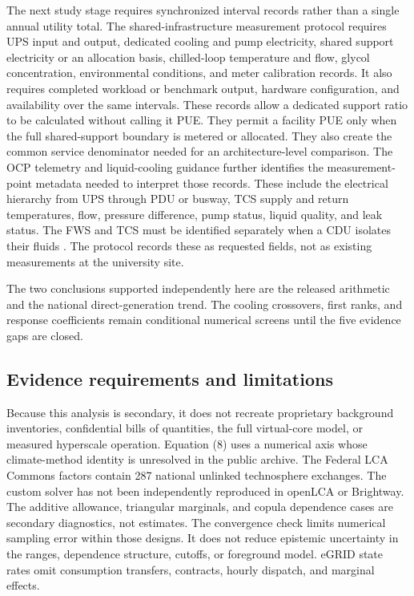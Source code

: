 \documentclass[review,12pt]{elsarticle}
\begin{document}
The next study stage requires synchronized interval records rather than a single annual utility total. The shared-infrastructure measurement protocol requires UPS input and output, dedicated cooling and pump electricity, shared support electricity or an allocation basis, chilled-loop temperature and flow, glycol concentration, environmental conditions, and meter calibration records. It also requires completed workload or benchmark output, hardware configuration, and availability over the same intervals. These records allow a dedicated support ratio to be calculated without calling it PUE. They permit a facility PUE only when the full shared-support boundary is metered or allocated. They also create the common service denominator needed for an architecture-level comparison. The OCP telemetry and liquid-cooling guidance further identifies the measurement-point metadata needed to interpret those records. These include the electrical hierarchy from UPS through PDU or busway, TCS supply and return temperatures, flow, pressure difference, pump status, liquid quality, and leak status. The FWS and TCS must be identified separately when a CDU isolates their fluids \cite{ref53,ref54,ref55,ref56}. The protocol records these as requested fields, not as existing measurements at the university site.

The two conclusions supported independently here are the released arithmetic and the national direct-generation trend. The cooling crossovers, first ranks, and response coefficients remain conditional numerical screens until the five evidence gaps are closed.

\subsection{Evidence requirements and limitations}
Because this analysis is secondary, it does not recreate proprietary background inventories, confidential bills of quantities, the full virtual-core model, or measured hyperscale operation. Equation (8) uses a numerical axis whose climate-method identity is unresolved in the public archive. The Federal LCA Commons factors contain 287 national unlinked technosphere exchanges. The custom solver has not been independently reproduced in openLCA or Brightway. The additive allowance, triangular marginals, and copula dependence cases are secondary diagnostics, not estimates. The convergence check limits numerical sampling error within those designs. It does not reduce epistemic uncertainty in the ranges, dependence structure, cutoffs, or foreground model. eGRID state rates omit consumption transfers, contracts, hourly dispatch, and marginal effects.
\end{document}
